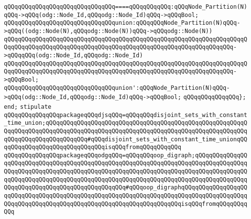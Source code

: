 \newline
\verb|qQQqqQQqqQQqqQQqqQQqqQQqqQQqqQQq====qQQqqQQqqQQq:qQQqNode_Partition(N)qQQq->qQQq(odg::Node_Id,qQQqodg::Node_Id)qQQq->qQQqBool;|\newline
\newline
\verb|qQQqqQQqqQQqqQQqqQQqqQQqqQQqqQQqunion:qQQqqQQqNode_Partition(N)qQQq->qQQq((odg::Node(N),qQQqodg::Node(N))qQQq->qQQqodg::Node(N))|\newline
\verb|qQQqqQQqqQQqqQQqqQQqqQQqqQQqqQQqqQQqqQQqqQQqqQQqqQQqqQQqqQQqqQQqqQQqqQQqqQQqqQQqqQQqqQQqqQQqqQQqqQQqqQQqqQQqqQQqqQQqqQQqqQQqqQQqqQQqqQQq->qQQqqQQq(odg::Node_Id,qQQqodg::Node_Id)|\newline
\verb|qQQqqQQqqQQqqQQqqQQqqQQqqQQqqQQqqQQqqQQqqQQqqQQqqQQqqQQqqQQqqQQqqQQqqQQqqQQqqQQqqQQqqQQqqQQqqQQqqQQqqQQqqQQqqQQqqQQqqQQqqQQqqQQqqQQqqQQq->qQQqBool;|\newline
\newline
\verb|qQQqqQQqqQQqqQQqqQQqqQQqqQQqqQQqunion':qQQqNode_Partition(N)qQQq->qQQq(odg::Node_Id,qQQqodg::Node_Id)qQQq->qQQqBool;|\newline
\newline
\verb|qQQqqQQqqQQqqQQq};|\newline
\verb|end;|\newline
\newline
\newline
\newline
\verb|stipulate|\newline
\verb|qQQqqQQqqQQqqQQqpackageqQQqdjsqQQq=qQQqqQQqdisjoint_sets_with_constant_time_union;qQQqqQQqqQQqqQQqqQQqqQQqqQQqqQQqqQQqqQQqqQQqqQQqqQQqqQQqqQQqqQQqqQQqqQQqqQQqqQQqqQQqqQQqqQQqqQQqqQQqqQQqqQQqqQQqqQQqqQQqqQQqqQQqqQQqqQQqqQQqqQQqqQQqqQQq#qQQqdisjoint_sets_with_constant_time_unionqQQqqQQqqQQqqQQqqQQqqQQqqQQqqQQqisqQQqfromqQQqqQQqqQQq|\newline
\verb|qQQqqQQqqQQqqQQqpackageqQQqodgqQQq=qQQqqQQqoop_digraph;qQQqqQQqqQQqqQQqqQQqqQQqqQQqqQQqqQQqqQQqqQQqqQQqqQQqqQQqqQQqqQQqqQQqqQQqqQQqqQQqqQQqqQQqqQQqqQQqqQQqqQQqqQQqqQQqqQQqqQQqqQQqqQQqqQQqqQQqqQQqqQQqqQQqqQQqqQQqqQQqqQQqqQQqqQQqqQQqqQQqqQQqqQQqqQQqqQQqqQQqqQQqqQQqqQQqqQQqqQQqqQQqqQQqqQQqqQQqqQQqqQQqqQQqqQQqqQQqqQQq#qQQqoop_digraphqQQqqQQqqQQqqQQqqQQqqQQqqQQqqQQqqQQqqQQqqQQqqQQqqQQqqQQqqQQqqQQqqQQqqQQqqQQqqQQqqQQqqQQqqQQqqQQqqQQqqQQqqQQqqQQqqQQqqQQqqQQqqQQqqQQqqQQqqQQqisqQQqfromqQQqqQQqqQQq|\newline
